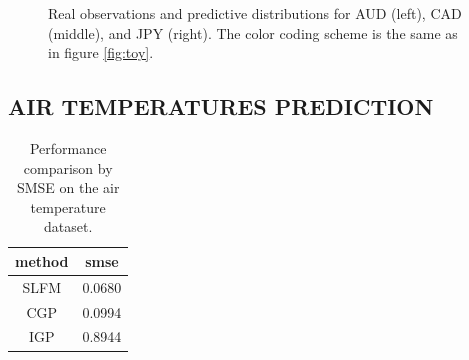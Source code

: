 \begin{figure}
\begin{tabular}{ccc}
\end{tabular}
\caption{Real observations and predictive distributions for AUD (left), CAD (middle), and JPY (right). The color coding scheme is the same as in figure \ref{fig:toy}.}
\label{fig:fx}
\end{figure}

\subsection{AIR TEMPERATURES PREDICTION}

\begin{table}[h]
\caption{Performance comparison by SMSE on the air temperature dataset.}
\label{tab:fx}
\begin{center}
\begin{tabular}{c|c}
method & smse \\ \hline
SLFM & 0.0680 \\
CGP & 0.0994 \\
IGP & 0.8944
\end{tabular}
\end{center}
\end{table}

